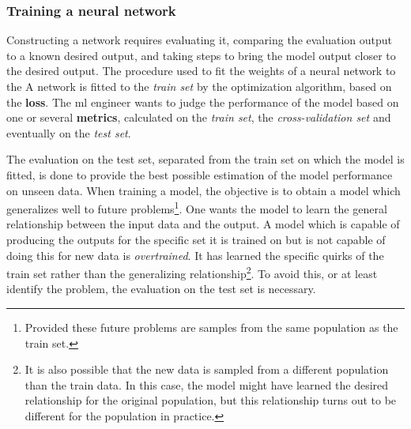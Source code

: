 \subsubsection{Training a neural network}
\par{
    Constructing a network requires evaluating it, comparing the evaluation output to a known desired output, and taking steps to bring the model output closer to the desired output. 
    The procedure used to fit the weights of a neural network to the 
    A network is fitted to the \textit{train set} by the optimization algorithm, based on the \textbf{loss}.
    The \acrshort{ml} engineer wants to judge the performance of the model based on one or several \textbf{metrics}, calculated on the \textit{train set}, the \textit{cross-validation set} and eventually on the \textit{test set}.
}
\par{
    The evaluation on the test set, separated from the train set on which the model is fitted, is done to provide the best possible estimation of the model performance on unseen data.
    When training a model, the objective is to obtain a model which generalizes well to future problems\footnote{
        Provided these future problems are samples from the same population as the train set.
    }. One wants the model to learn the general relationship between the input data and the output.
    A model which is capable of producing the outputs for the specific set it is trained on but is not capable of doing this for new data is \textit{overtrained}.
    It has learned the specific quirks of the train set rather than the generalizing relationship\footnote{
        It is also possible that the new data is sampled from a different population than the train data.
        In this case, the model might have learned the desired relationship for the original population, but this relationship turns out to be different for the population in practice.
        }.
    To avoid this, or at least identify the problem, the evaluation on the test set is necessary.
}

